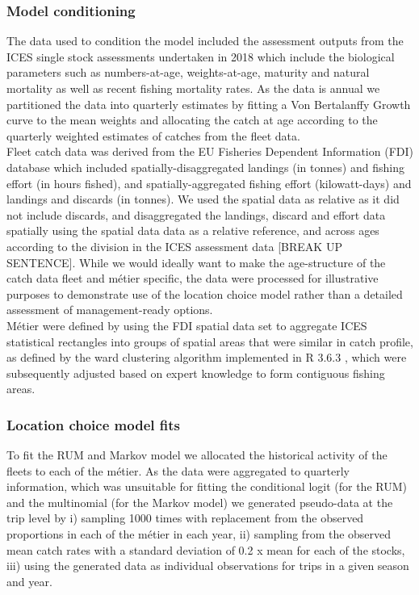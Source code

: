 \documentclass[12pt, halfline, a4paper]{ouparticle}
\begin{document}
\subsubsection{Model conditioning}

The data used to condition the model included the assessment outputs from the
ICES single stock assessments undertaken in 2018 \citep{ICES2018} which include
the biological parameters such as numbers-at-age, weights-at-age, maturity and
natural mortality as well as recent fishing mortality rates. As the data is
annual we partitioned the data into quarterly estimates by fitting a Von
Bertalanffy Growth curve to the mean weights and allocating the catch at age
according to the quarterly weighted estimates of catches from the fleet data.
\\

Fleet catch data was derived from the EU Fisheries Dependent Information
(FDI) database \citep{STECF2017} which included spatially-disaggregated
landings (in tonnes) and fishing effort (in hours fished), and spatially-aggregated 
fishing effort (kilowatt-days) and landings and discards (in
tonnes). We used the spatial data as relative as it did not include discards,
and disaggregated the landings, discard and effort data spatially using the
spatial data data as a relative reference, and across ages according to the
division in the ICES assessment data [BREAK UP SENTENCE]. While we would ideally want to make the
age-structure of the catch data fleet and métier specific, the data were
processed for illustrative purposes to demonstrate use of the location choice
model rather than a detailed assessment of management-ready options. \\

Métier were defined by using the FDI spatial data set to aggregate ICES
statistical rectangles into groups of spatial areas that were similar in catch
profile, as defined by the ward clustering algorithm implemented in R 3.6.3
\citep{Team2020}, which were subsequently adjusted based on expert knowledge to
form contiguous fishing areas. \\ 

\subsubsection{Location choice model fits}

To fit the RUM and Markov model we allocated the historical activity of the
fleets to each of the métier. As the data were aggregated to quarterly
information, which was unsuitable for fitting the conditional logit (for the
RUM) and the multinomial (for the Markov model) we generated pseudo-data
at the trip level by i) sampling 1000 times with replacement from the observed
proportions in each of the métier in each year, ii) sampling from the observed
mean catch rates with a standard deviation of 0.2 x mean for each of the
stocks, iii) using the generated data as individual observations for trips in a
given season and year. \\
\end{document}
